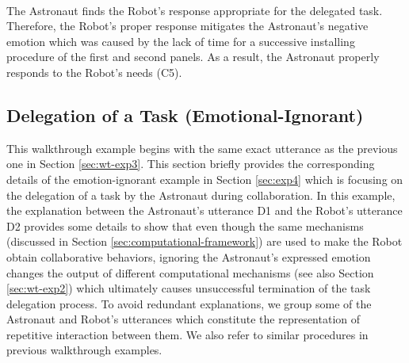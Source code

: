 \noindent{}\\

The Astronaut finds the Robot's response appropriate for the delegated task.
Therefore, the Robot's proper response mitigates the Astronaut's negative
emotion which was caused by the lack of time for a successive installing
procedure of the first and second panels. As a result, the Astronaut properly
responds to the Robot's needs (C5).\\

\noindent{}

\subsection{Delegation of a Task (Emotional-Ignorant)}
\label{sec:wt-exp4}

This walkthrough example begins with the same exact utterance as the previous
one in Section \ref{sec:wt-exp3}. This section briefly provides the
corresponding details of the emotion-ignorant example in Section \ref{sec:exp4}
which is focusing on the delegation of a task by the Astronaut during
collaboration. In this example, the explanation between the Astronaut's
utterance D1 and the Robot's utterance D2 provides some details to show that
even though the same mechanisms (discussed in Section
\ref{sec:computational-framework}) are used to make the Robot obtain
collaborative behaviors, ignoring the Astronaut's expressed emotion changes the
output of different computational mechanisms (see also Section
\ref{sec:wt-exp2}) which ultimately causes unsuccessful termination of the task
delegation process. To avoid redundant explanations, we group some of the
Astronaut and Robot's utterances which constitute the representation of
repetitive interaction between them. We also refer to similar procedures in
previous walkthrough examples.\\

\noindent{}\\

